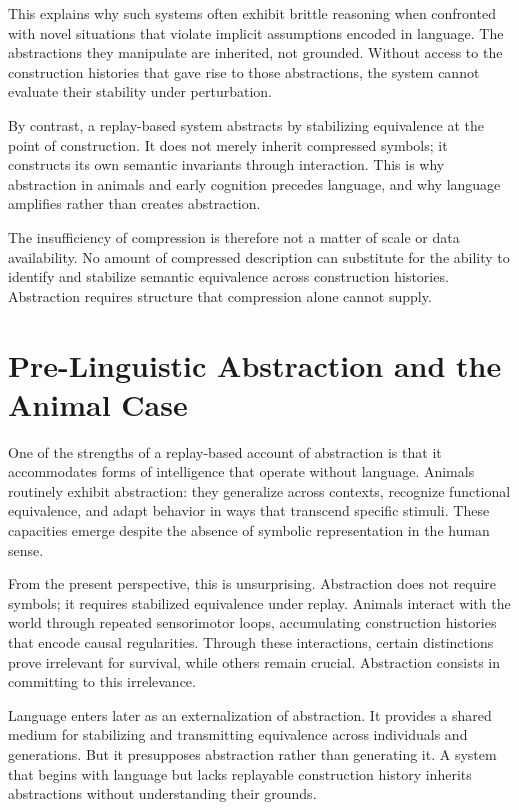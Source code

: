 \documentclass[11pt]{article}
\begin{document}
This explains why such systems often exhibit brittle reasoning when confronted with novel situations that violate implicit assumptions encoded in language. The abstractions they manipulate are inherited, not grounded. Without access to the construction histories that gave rise to those abstractions, the system cannot evaluate their stability under perturbation.

By contrast, a replay-based system abstracts by stabilizing equivalence at the point of construction. It does not merely inherit compressed symbols; it constructs its own semantic invariants through interaction. This is why abstraction in animals and early cognition precedes language, and why language amplifies rather than creates abstraction.

The insufficiency of compression is therefore not a matter of scale or data availability. No amount of compressed description can substitute for the ability to identify and stabilize semantic equivalence across construction histories. Abstraction requires structure that compression alone cannot supply.

\section{Pre-Linguistic Abstraction and the Animal Case}

One of the strengths of a replay-based account of abstraction is that it accommodates forms of intelligence that operate without language. Animals routinely exhibit abstraction: they generalize across contexts, recognize functional equivalence, and adapt behavior in ways that transcend specific stimuli. These capacities emerge despite the absence of symbolic representation in the human sense.

From the present perspective, this is unsurprising. Abstraction does not require symbols; it requires stabilized equivalence under replay. Animals interact with the world through repeated sensorimotor loops, accumulating construction histories that encode causal regularities. Through these interactions, certain distinctions prove irrelevant for survival, while others remain crucial. Abstraction consists in committing to this irrelevance.

Language enters later as an externalization of abstraction. It provides a shared medium for stabilizing and transmitting equivalence across individuals and generations. But it presupposes abstraction rather than generating it. A system that begins with language but lacks replayable construction history inherits abstractions without understanding their grounds.
\end{document}
